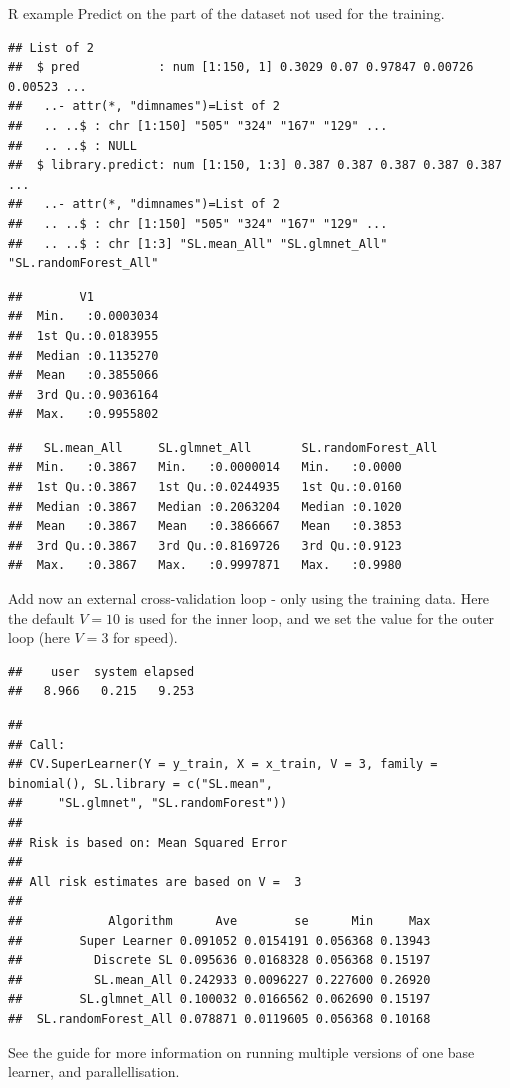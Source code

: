 \documentclass[
  ignorenonframetext,
]{beamer}
\begin{document}
\begin{frame}[fragile]
\begin{block}{R example}
Predict on the part of the dataset not used for the training.

\begin{verbatim}
## List of 2
##  $ pred           : num [1:150, 1] 0.3029 0.07 0.97847 0.00726 0.00523 ...
##   ..- attr(*, "dimnames")=List of 2
##   .. ..$ : chr [1:150] "505" "324" "167" "129" ...
##   .. ..$ : NULL
##  $ library.predict: num [1:150, 1:3] 0.387 0.387 0.387 0.387 0.387 ...
##   ..- attr(*, "dimnames")=List of 2
##   .. ..$ : chr [1:150] "505" "324" "167" "129" ...
##   .. ..$ : chr [1:3] "SL.mean_All" "SL.glmnet_All" "SL.randomForest_All"
\end{verbatim}

\begin{verbatim}
##        V1           
##  Min.   :0.0003034  
##  1st Qu.:0.0183955  
##  Median :0.1135270  
##  Mean   :0.3855066  
##  3rd Qu.:0.9036164  
##  Max.   :0.9955802
\end{verbatim}

\begin{verbatim}
##   SL.mean_All     SL.glmnet_All       SL.randomForest_All
##  Min.   :0.3867   Min.   :0.0000014   Min.   :0.0000     
##  1st Qu.:0.3867   1st Qu.:0.0244935   1st Qu.:0.0160     
##  Median :0.3867   Median :0.2063204   Median :0.1020     
##  Mean   :0.3867   Mean   :0.3866667   Mean   :0.3853     
##  3rd Qu.:0.3867   3rd Qu.:0.8169726   3rd Qu.:0.9123     
##  Max.   :0.3867   Max.   :0.9997871   Max.   :0.9980
\end{verbatim}

Add now an external cross-validation loop - only using the training
data. Here the default \(V=10\) is used for the inner loop, and we set
the value for the outer loop (here \(V=3\) for speed).

\begin{verbatim}
##    user  system elapsed 
##   8.966   0.215   9.253
\end{verbatim}

\begin{verbatim}
## 
## Call:  
## CV.SuperLearner(Y = y_train, X = x_train, V = 3, family = binomial(), SL.library = c("SL.mean",  
##     "SL.glmnet", "SL.randomForest")) 
## 
## Risk is based on: Mean Squared Error
## 
## All risk estimates are based on V =  3 
## 
##            Algorithm      Ave        se      Min     Max
##        Super Learner 0.091052 0.0154191 0.056368 0.13943
##          Discrete SL 0.095636 0.0168328 0.056368 0.15197
##          SL.mean_All 0.242933 0.0096227 0.227600 0.26920
##        SL.glmnet_All 0.100032 0.0166562 0.062690 0.15197
##  SL.randomForest_All 0.078871 0.0119605 0.056368 0.10168
\end{verbatim}

See the guide for more information on running multiple versions of one
base learner, and parallellisation.

\end{block}

\end{frame}
\end{document}
